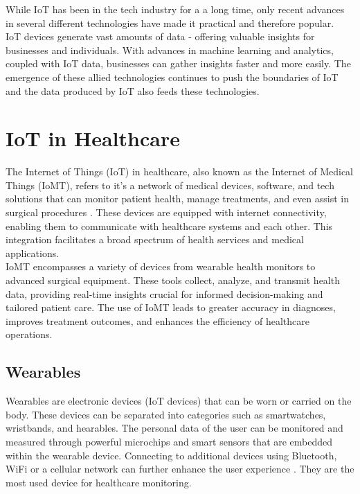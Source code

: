 While IoT has been in the tech industry for a a long time, only recent advances in several different technologies have made it practical and therefore popular. \\

IoT devices generate vast amounts of data - offering valuable insights for businesses and individuals. With advances in machine learning and analytics, coupled with IoT data, businesses can gather insights faster and more easily. The emergence of these allied technologies continues to push the boundaries of IoT and the data produced by IoT also feeds these technologies. \cite{ref16}

\section{IoT in Healthcare}
The Internet of Things (IoT) in healthcare, also known as the Internet of Medical Things (IoMT), refers to  it’s a network of medical devices, software, and tech solutions that can monitor patient health, manage treatments, and even assist in surgical procedures \cite{47}. These devices are equipped with internet connectivity, enabling them to communicate with healthcare systems and each other. This integration facilitates a broad spectrum of health services and medical applications. \\

IoMT encompasses a variety of devices from wearable health monitors to advanced surgical equipment. These tools collect, analyze, and transmit health data, providing real-time insights crucial for informed decision-making and tailored patient care. The use of IoMT leads to greater accuracy in diagnoses, improves treatment outcomes, and enhances the efficiency of healthcare operations.\\



\subsection{Wearables}

Wearables are electronic devices (IoT devices) that can be worn or carried on the body. These devices can be separated into categories such as smartwatches, wristbands, and hearables. The personal data of the user can be monitored and measured through powerful microchips and smart sensors that are embedded within the wearable device. Connecting to additional devices using Bluetooth, WiFi or a cellular network can further enhance the user experience \cite{ref17}. They are the most used device for healthcare monitoring. \\

